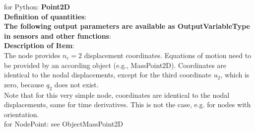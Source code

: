  for Python: {\bf Point2D}
 \vspace{6pt}\\{\bf Definition of quantities}:\\
\finishTable
{\bf The following output parameters are available as OutputVariableType in sensors and other functions}:\\ 
\finishTable
{\bf Description of Item}:
 \noindent
    \vspace{6pt}\\
    The node provides $n_c=2$ displacement coordinates. Equations of motion need to be provided by an according object (e.g., MassPoint2D).
    Coordinates are identical to the nodal displacements, except for the third coordinate $u_2$, which is zero, because $q_2$ does not exist. \vspace{6pt}\\
    Note that for this very simple node, coordinates are identical to the nodal displacements, same for time derivatives. This is not the case, e.g. for nodes with orientation. \vspace{6pt}\\
     for NodePoint: see ObjectMassPoint2D
\newpage

